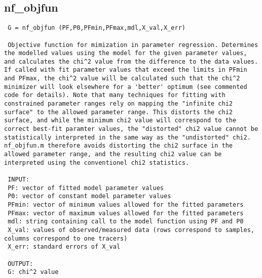 \subsection{nf\_objfun}\label{sec:ref-nf_objfun}
\begin{lstlisting}
 G = nf_objfun (PF,P0,PFmin,PFmax,mdl,X_val,X_err)

 Objective function for mimization in parameter regression. Determines the modelled values using the model for the given parameter values, and calculates the chi^2 value from the difference to the data values. If called with fit parameter values that exceed the limits in PFmin and PFmax, the chi^2 value will be calculated such that the chi^2 minimizer will look elsewhere for a 'better' optimum (see commented code for details). Note that many techniques for fitting with constrained parameter ranges rely on mapping the "infinite chi2 surface" to the allowed parameter range. This distorts the chi2 surface, and while the minimum chi2 value will correspond to the correct best-fit paramter values, the "distorted" chi2 value cannot be statistically interpreted in the same way as the "undistorted" chi2. nf_objfun.m therefore avoids distorting the chi2 surface in the allowed parameter range, and the resulting chi2 value can be interpreted using the conventionel chi2 statistics.

 INPUT:
 PF: vector of fitted model parameter values
 P0: vector of constant model parameter values
 PFmin: vector of minimum values allowed for the fitted parameters
 PFmax: vector of maximum values allowed for the fitted parameters
 mdl: string containing call to the model function using PF and P0
 X_val: values of observed/measured data (rows correspond to samples, columns correspond to one tracers)
 X_err: standard errors of X_val

 OUTPUT:
 G: chi^2 value

 
\end{lstlisting}


